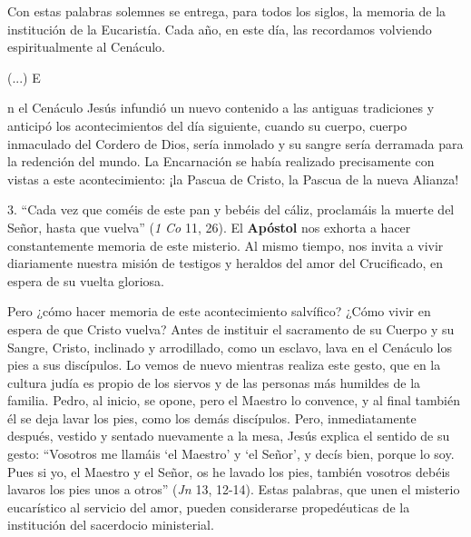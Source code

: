 			\begin{body}Con estas palabras solemnes se entrega, para todos los siglos, la memoria de la institución de la Eucaristía. Cada año, en este día, las recordamos volviendo espiritualmente al Cenáculo. \end{body}
			
			\begin{body}\begin{bodysmall}\end{bodysmall}\end{body}
			
			\begin{body}\begin{bodysmall}(...) E\end{bodysmall}n el Cenáculo Jesús infundió un nuevo contenido a las antiguas tradiciones y anticipó los acontecimientos del día siguiente, cuando su cuerpo, cuerpo inmaculado del Cordero de Dios, sería inmolado y su sangre sería derramada para la redención del mundo. La Encarnación se había realizado precisamente con vistas a este acontecimiento: ¡la Pascua de Cristo, la Pascua de la nueva Alianza!\end{body}
			
			\begin{body}3. “Cada vez que coméis de este pan y bebéis del cáliz, proclamáis la muerte del Señor, hasta que vuelva” (\textit{1 Co} 11, 26). El \textbf{Apóstol} nos exhorta a hacer constantemente memoria de este misterio. Al mismo tiempo, nos invita a vivir diariamente nuestra misión de testigos y heraldos del amor del Crucificado, en espera de su vuelta gloriosa.\end{body}
			
			\begin{body}Pero ¿cómo hacer memoria de este acontecimiento salvífico? ¿Cómo vivir en espera de que Cristo vuelva? Antes de instituir el sacramento de su Cuerpo y su Sangre, Cristo, inclinado y arrodillado, como un esclavo, lava en el Cenáculo los pies a sus discípulos. Lo vemos de nuevo mientras realiza este gesto, que en la cultura judía es propio de los siervos y de las personas más humildes de la familia. Pedro, al inicio, se opone, pero el Maestro lo convence, y al final también él se deja lavar los pies, como los demás discípulos. Pero, inmediatamente después, vestido y sentado nuevamente a la mesa, Jesús explica el sentido de su gesto: “Vosotros me llamáis ‘el Maestro’ y ‘el Señor’, y decís bien, porque lo soy. Pues si yo, el Maestro y el Señor, os he lavado los pies, también vosotros debéis lavaros los pies unos a otros” (\textit{Jn} 13, 12-14). Estas palabras, que unen el misterio eucarístico al servicio del amor, pueden considerarse propedéuticas de la institución del sacerdocio ministerial.\end{body}
			
